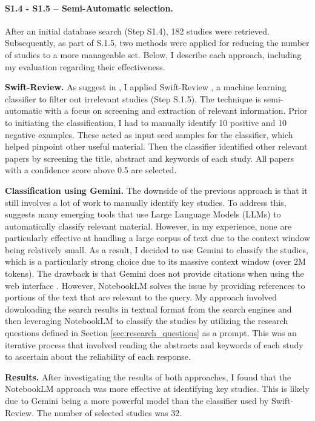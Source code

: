 \paragraph{S1.4 - S1.5 -- Semi-Automatic selection.}
After an initial database search (Step S1.4), 182 studies were retrieved. Subsequently, as part of
S.1.5, two methods were applied for reducing the number of studies to a more manageable set. Below,
I describe each approach, including my evaluation regarding their effectiveness.

\textbf{Swift-Review.}
As suggest in \cite{bolanos_artificial_2024},
I applied Swift-Review \cite{Howard2016SWIFTReviewAT}, a machine learning classifier to filter out
irrelevant studies (Step S.1.5). The technique is semi-automatic
with a focus on screening and extraction of relevant information. Prior to initiating the classification,
I had to manually identify 10 positive and 10 negative examples. These
acted as input seed samples for the classifier, which helped pinpoint other useful material. Then
the classifier identified other relevant papers by screening the title, abstract and keywords of
each study. All papers with a confidence score above 0.5 are selected.

\textbf{Classification using Gemini.}
The downside of the previous approach is that it still involves a lot of work to manually identify key
studies. To address this, \cite{bolanos_artificial_2024} suggests many emerging tools that use Large Language Models (LLMs)
to automatically classify relevant material. However, in my experience, none are particularly effective
at handling a large corpus of text due to the context window being relatively small. As a result, I decided
to use Gemini \cite{team_gemini_2024} to classify the studies, which is a particularly strong choice due to its massive
context window (over 2M tokens). The drawback is that Gemini does not provide citations when using the web interface
\cite{noauthor_gemini_nodate}. However, NotebookLM \cite{notebooklm_google_2024} solves the issue by providing references
to portions of the text that are relevant to the query. My approach involved downloading the search results in textual format from the
search engines and then leveraging NotebookLM to classify the studies by utilizing the research questions
defined in Section \ref{sec:research_questions} as a prompt. This was an iterative process that involved
reading the abstracts and keywords of each study to ascertain about the reliability of each response.

\textbf{Results.}
After investigating the results of both approaches, I found that the NotebookLM approach was more
effective at identifying key studies. This is likely due to Gemini being a more powerful
model than the classifier used by Swift-Review. The number of selected studies was 32.

